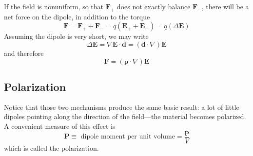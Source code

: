 \documentclass[../../../main.tex]{subfiles}
\begin{document}
If the field is nonuniform, so that $\mathbf{F}_+$ does not exactly balance $\mathbf{F}_-$, there will be
a net force on the dipole, in addition to the torque
\begin{equation*}
    \mathbf{F} = \mathbf{F}_+ + \mathbf{F}_- = q(\mathbf{E}_++ \mathbf{E}_-) = q(\Delta \mathbf{E})
\end{equation*}
Assuming the dipole is very short, we may write
\begin{equation*}
    \Delta \mathbf{E}=\nabla  \mathbf{E}\cdot \mathbf{d}=(\mathbf{d}\cdot\nabla) \mathbf{E}
\end{equation*}
and therefore
\begin{equation*}
    \mathbf{F} = (\mathbf{p}\cdot\nabla) \mathbf{E}
\end{equation*}

\subsection{Polarization}
Notice that those two mechanisms produce the same basic result: a lot of little dipoles pointing along the direction of the field—the material becomes polarized. A convenient measure of this effect is
\begin{equation*}
    \mathbf{P}\equiv\text{ dipole moment per unit volume}=\frac{\mathbf{p}}{V}
\end{equation*}
which is called the polarization. 
\end{document}
